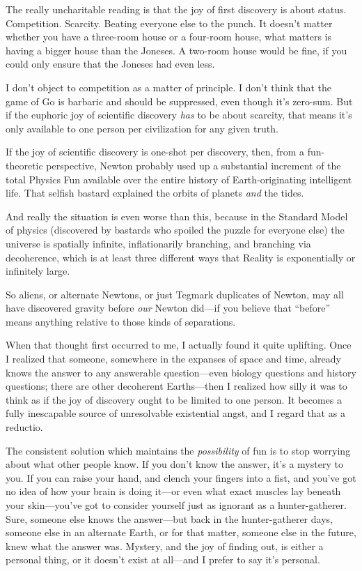{
 The really uncharitable reading is that the joy of first discovery
is about status. Competition. Scarcity. Beating everyone else to the
punch. It doesn't matter whether you have a three-room
house or a four-room house, what matters is having a bigger house than
the Joneses. A two-room house would be fine, if you could only ensure
that the Joneses had even less.}

{
 I don't object to competition as a matter of
principle. I don't think that the game of Go is
barbaric and should be suppressed, even though it's
zero-sum. But if the euphoric joy of scientific discovery \textit{has}
to be about scarcity, that means it's only available to
one person per civilization for any given truth.}

{
 If the joy of scientific discovery is one-shot per discovery,
then, from a fun-theoretic perspective, Newton probably used up a
substantial increment of the total Physics Fun available over the
entire history of Earth-originating intelligent life. That selfish
bastard explained the orbits of planets \textit{and} the tides.}

{
 And really the situation is even worse than this, because in the
Standard Model of physics (discovered by bastards who spoiled the
puzzle for everyone else) the universe is spatially infinite,
inflationarily branching, and branching via decoherence, which is at
least three different ways that Reality is exponentially or infinitely
large.}

{
 So aliens, or alternate Newtons, or just Tegmark duplicates of
Newton, may all have discovered gravity before \textit{our} Newton
did---if you believe that ``before''
means anything relative to those kinds of separations.}

{
 When that thought first occurred to me, I actually found it quite
uplifting. Once I realized that someone, somewhere in the expanses of
space and time, already knows the answer to any answerable
question---even biology questions and history questions; there are
other decoherent Earths---then I realized how silly it was to think as
if the joy of discovery ought to be limited to one person. It becomes a
fully inescapable source of unresolvable existential angst, and I
regard that as a reductio.}

{
 The consistent solution which maintains the \textit{possibility}
of fun is to stop worrying about what other people know. If you
don't know the answer, it's a mystery
to you. If you can raise your hand, and clench your fingers into a
fist, and you've got no idea of how your brain is doing
it---or even what exact muscles lay beneath your
skin---you've got to consider yourself just as ignorant
as a hunter-gatherer. Sure, someone else knows the answer---but back in
the hunter-gatherer days, someone else in an alternate Earth, or for
that matter, someone else in the future, knew what the answer was.
Mystery, and the joy of finding out, is either a personal thing, or it
doesn't exist at all---and I prefer to say
it's personal.}

